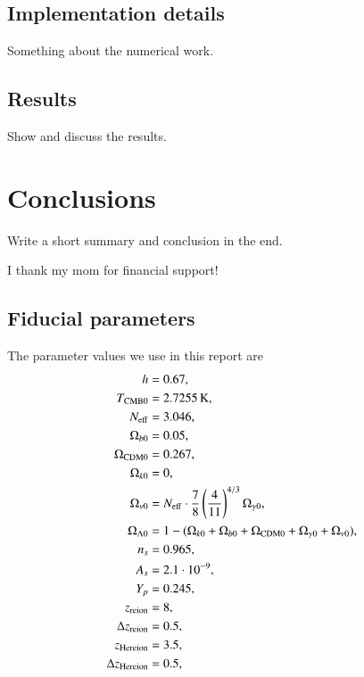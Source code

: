 \documentclass{aa}
\begin{document}
\subsection{Implementation details}
Something about the numerical work.

\subsection{Results}
Show and discuss the results.

\section{Conclusions}

Write a short summary and conclusion in the end. 

\begin{acknowledgements}
      I thank my mom for financial support!
\end{acknowledgements}




% 


\begin{appendix}
\section{Fiducial parameters} \label{app:M1:fiducial_parameters}
The parameter values we use in this report are 
\begin{equation} \label{eq:Appendix:Fiducial_cosmology_parameters}
      \begin{split}
            h &= 0.67, \\ 
            T_\mathrm{CMB0} &= 2.7255\,\mathrm{K}, \\
            N_\mathrm{eff} &= 3.046, \\
            \Omega_{b0} &= 0.05, \\
            \Omega_\mathrm{CDM0} &= 0.267,\\
            \Omega_{k0} &=0,\\
            \Omega_{\nu 0} &= N_\mathrm{eff} \cdot \frac{7}{8} \left( \frac{4}{11} \right)^{4/3} \Omega_{\gamma 0}, \\
            \Omega_{\Lambda 0} &= 1 - (\Omega_{k0} + \Omega_{b0} + \Omega_\mathrm{CDM0} + \Omega_{\gamma 0} + \Omega_{\nu 0}), \\
            n_s &= 0.965,\\
            A_s &= 2.1\cdot 10^{-9},\\
            Y_p &= 0.245, \\
            z_\mathrm{reion} &= 8, \\
            \Delta z_\mathrm{reion} &= 0.5, \\
            z_\mathrm{Hereion} &= 3.5, \\
            \Delta z_\mathrm{Hereion} &= 0.5, \\
      \end{split}
\end{equation}


\end{appendix}
\end{document}
